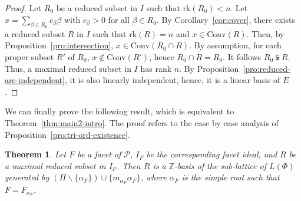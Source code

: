\documentclass[10pt]{amsart}
\newtheorem{thm}{Theorem}[section]
\theoremstyle{definition}
\theoremstyle{remark}
\newcommand\smeno{\smallsetminus}
\newcommand\ganz{\mathbb Z}
\newcommand\pol{\mathcal P}
\newcommand\conv{\mathrm{Conv}}
\newcommand\rk{\mathrm{rk}}
\newcommand\al{\alpha}
\newcommand\be{\beta}
\begin{document}
\begin{proof}
Let $R_0$ be a reduced subset in $I$ such that $\rk (R_0)< n$. 
Let $x=\sum_{\be\in R_0} c_\be \be$ with $c_\be> 0$ for all $\be \in R_0$.
By Corollary~\ref{cor:cover}, there exists a reduced subset $R$ in $I$ such that $\rk(R)=n$ and $x\in \conv(R)$. 
Then, by Proposition~\ref{pro:intersection}, $x\in \conv(R_0\cap R)$. 
By assumption, for each proper subset $R'$ of $R_0$, $x\not\in\conv(R')$, hence $R_0\cap R=R_0$.
It follows  $R_0\subsetneqq R$.
Thus, a maximal reduced subset in $I$ has rank $n$.
By Proposition~\ref{pro:reduced-are-independent}, it is also linearly independent, hence, it is a linear basis of $E$.
\end{proof}
 
We can finally prove the following result, which  is equivalent to  Theorem~\ref{thm:main2-intro}. 
The proof refers to the case by case analysis of Proposition~\ref{pro:tri-ord-existence}. 

\begin{thm}\label{thm:main2}
Let $F$ be a facet of $\pol$, $I_F$ be the corresponding facet ideal, and $R$ be a maximal reduced subset in $I_F$. 
Then $R$ is a $\ganz$-basis of the sub-lattice of $L(\Phi)$ generated by $(\Pi\smeno\{\al_F\})\cup \{m_{\al_F}\al_F\}$, where $\al_F$ is  the simple root such that $F=F_{\al_F}$.
\end{thm}
\end{document}
